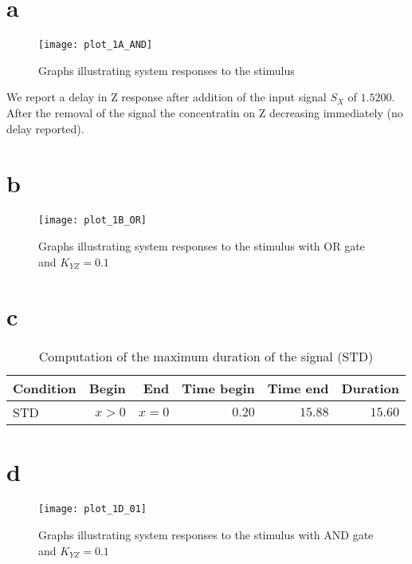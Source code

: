 \newcommand{\package}{\emph}

\setcounter{chapter}{1}
\setcounter{section}{0}

\section{a}

\begin{figure}[h!]
 \centering
    \texttt{[image: plot\_1A\_AND]} 
    \caption{Graphs illustrating system responses to the stimulus}
	\label{fig:plot_1A_AND}
\end{figure}

We report a delay in Z response after addition of the input signal \emph{$S_X$}
of $1.5200$. After the removal of the signal the concentratin on Z decreasing
immediately (no delay reported).
\newpage
\section{b}


\begin{figure}[h!]
 \centering
    \texttt{[image: plot\_1B\_OR]} 
    \caption{Graphs illustrating system responses to the stimulus with OR
    gate and $K_{YZ} = 0.1 $}
	\label{fig:plot_1A_OR}
\end{figure}

\section{c}

\begin{table}[h!]
\begin{center}
\begin{tabular}{|l|rr|rr|r|}
\hline
Condition & Begin & End & Time begin & Time end & Duration \\
\hline
STD & $x>0$ & $x=0$ & $0.20$ & $15.88$ & $15.60$\\ 
\hline
\bottomrule
\end{tabular}
\caption{Computation of the maximum duration of the signal (STD)}
\end{center}
\end{table}			

\newpage
\section{d}

\begin{figure}[h!]
 \centering
    \texttt{[image: plot\_1D\_01]} 
    \caption{Graphs illustrating system responses to the stimulus with AND
    gate and $K_{YZ} = 0.1 $}
	\label{fig:plot_1D_01}
\end{figure}

